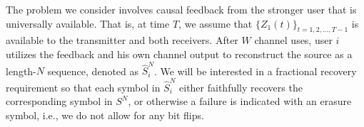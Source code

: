 %
%
%
%


The problem we consider involves causal feedback from the stronger user that is universally available.  That is, at time $T$, we assume that $\{Z_1(t)\}_{t=1, 2, \ldots, T-1}$ is available to the transmitter and both receivers. 
After $W$ channel uses, user $i$ utilizes the feedback and his own channel output to reconstruct the source as a length-$N$ sequence, denoted as $\hat{S}_{i}^{N}$.  We will be interested in a fractional recovery requirement so that each symbol in $\hat{S}_{i}^{N}$ either faithfully recovers the corresponding symbol in $S^{N}$, or otherwise a failure is indicated with an erasure symbol, i.e., we do not allow for any bit flips.


